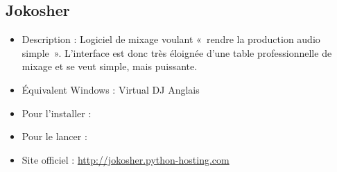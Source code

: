 \subsection{Jokosher}
\begin{itemize}
\begingroup
{}
\item Description : Logiciel de mixage voulant «~rendre la production audio simple~». L'interface est donc très éloignée d'une table professionnelle de mixage et se veut simple, mais puissante.{\par}
\item Équivalent Windows : Virtual DJ Anglais{\par}
\item Pour l'installer : 
\item Pour le lancer : 
\item Site officiel : \url{http://jokosher.python-hosting.com}{\par}
\endgroup
\end{itemize}
